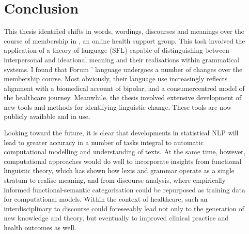

\section{Conclusion}

This thesis identified shifts in words, wordings, discourses and meanings over the course of membership in , an online health support group. This task involved the application of a theory of language (\gls{SFL}) capable of distinguishing between interpersonal and ideational meaning and their realisations within grammatical systems. I found that \gls{Forum} ' language undergoes a number of changes over the membership course. Most obviously, their language use increasingly reflects alignment with a biomedical account of \gls{bipolar}, and a \gls{consumercentred} model of the healthcare journey. Meanwhile, the thesis involved extensive development of new tools and methods for identifying linguistic change. These tools are now publicly available and in use.

Looking toward the future, it is clear that developments in statistical \gls{NLP} will lead to greater accuracy in a number of tasks integral to automatic computational modelling and understanding of texts. At the same time, however, computational approaches would do well to incorporate insights from functional linguistic theory, which has shown how lexis and grammar operate as a single stratum to realise meaning, and from discourse analysis, where empirically informed functional\hyp{}semantic categorisation could be repurposed as training data for computational models. Within the context of healthcare, such an interdisciplinary to discourse could foreseeably lead not only to the generation of new knowledge and theory, but eventually to improved clinical practice and health outcomes as well.

